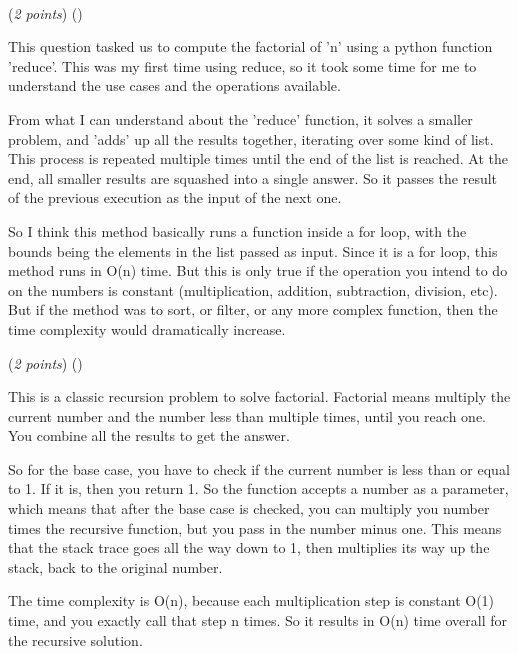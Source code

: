\documentclass{template}
\begin{document}
\begin{problem}
~\newline
~\newline


\begin{subproblem}
(\textit{2 points}) (\scoretextemoji{}\scorecodeemoji{})


\end{subproblem}

\begin{solution}
This question tasked us to compute the factorial of 'n' using a python function 'reduce'. This was my first time using reduce, so it took some time for me to understand the use cases and the operations available. 

From what I can understand about the 'reduce' function, it solves a smaller problem, and 'adds' up all the results together, iterating over some kind of list. This process is repeated multiple times until the end of the list is reached. At the end, all smaller results are squashed into a single answer. So it passes the result of the previous execution as the input of the next one.

So I think this method basically runs a function inside a for loop, with the bounds being the elements in the list passed as input. Since it is a for loop, this method runs in O(n) time. But this is only true if the operation you intend to do on the numbers is constant (multiplication, addition, subtraction, division, etc). But if the method was to sort, or filter, or any more complex function, then the time complexity would dramatically increase.

\end{solution}

\begin{subproblem}
(\textit{2 points}) (\scoretextemoji{}\scorecodeemoji{})


\end{subproblem}

\begin{solution}
This is a classic recursion problem to solve factorial. Factorial means multiply the current number and the number less than multiple times, until you reach one. You combine all the results to get the answer. 

So for the base case, you have to check if the current number is less than or equal to 1. If it is, then you return 1. So the function accepts a number as a parameter, which means that after the base case is checked, you can multiply you number times the recursive function, but you pass in the number minus one. This means that the stack trace goes all the way down to 1, then multiplies its way up the stack, back to the original number. 

The time complexity is O(n), because each multiplication step is constant O(1) time, and you exactly call that step n times. So it results in O(n) time overall for the recursive solution.
\end{solution}
\end{problem}
\end{document}
